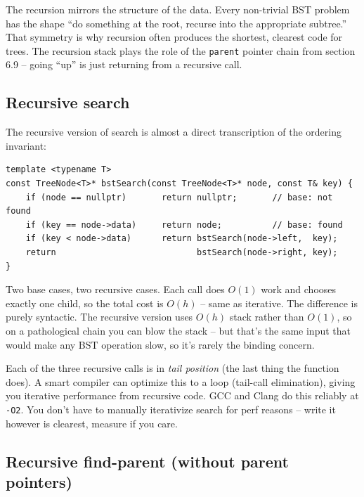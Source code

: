 \documentclass[11pt]{article}
\begin{document}
\begin{ideabox}
The recursion mirrors the structure of the data. Every non-trivial BST problem has the shape ``do something at the root, recurse into the appropriate subtree.'' That symmetry is why recursion often produces the shortest, clearest code for trees. The recursion stack plays the role of the \texttt{parent} pointer chain from section 6.9 -- going ``up'' is just returning from a recursive call.
\end{ideabox}

\subsection*{Recursive search}

The recursive version of search is almost a direct transcription of the ordering invariant:

\begin{lstlisting}
template <typename T>
const TreeNode<T>* bstSearch(const TreeNode<T>* node, const T& key) {
    if (node == nullptr)       return nullptr;       // base: not found
    if (key == node->data)     return node;          // base: found
    if (key < node->data)      return bstSearch(node->left,  key);
    return                            bstSearch(node->right, key);
}
\end{lstlisting}

Two base cases, two recursive cases. Each call does $O(1)$ work and chooses exactly one child, so the total cost is $O(h)$ -- same as iterative. The difference is purely syntactic. The recursive version uses $O(h)$ stack rather than $O(1)$, so on a pathological chain you can blow the stack -- but that's the same input that would make any BST operation slow, so it's rarely the binding concern.

\begin{notebox}
Each of the three recursive calls is in \emph{tail position} (the last thing the function does). A smart compiler can optimize this to a loop (tail-call elimination), giving you iterative performance from recursive code. GCC and Clang do this reliably at \texttt{-O2}. You don't have to manually iterativize search for perf reasons -- write it however is clearest, measure if you care.
\end{notebox}

\subsection*{Recursive find-parent (without parent pointers)}
\end{document}
